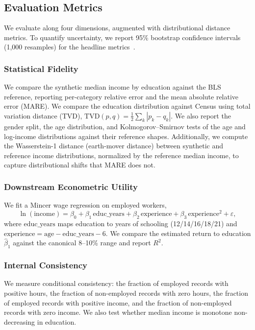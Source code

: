 \documentclass[11pt]{article}
\begin{document}
\subsection{Evaluation Metrics}

We evaluate along four dimensions, augmented with distributional distance metrics.
To quantify uncertainty, we report 95\% bootstrap confidence intervals (1{,}000 resamples) for the headline metrics~\cite{efron1994introduction}.

\subsubsection{Statistical Fidelity}
We compare the synthetic median income by education against the BLS reference, reporting per-category relative error and the mean absolute relative error (MARE).
We compare the education distribution against Census using total variation distance (TVD), $\mathrm{TVD}(p,q)=\frac{1}{2}\sum_k |p_k-q_k|$.
We also report the gender split, the age distribution, and Kolmogorov--Smirnov tests of the age and log-income distributions against their reference shapes.
Additionally, we compute the Wasserstein-1 distance (earth-mover distance) between synthetic and reference income distributions, normalized by the reference median income, to capture distributional shifts that MARE does not.

\subsubsection{Downstream Econometric Utility}
We fit a Mincer wage regression on employed workers,
\begin{equation}
\ln(\text{income}) = \beta_0 + \beta_1\,\text{educ\_years} + \beta_2\,\text{experience} + \beta_3\,\text{experience}^2 + \varepsilon,
\label{eq:mincer}
\end{equation}
where $\text{educ\_years}$ maps education to years of schooling (12/14/16/18/21) and $\text{experience} = \text{age} - \text{educ\_years} - 6$.
We compare the estimated return to education $\hat{\beta}_1$ against the canonical 8--10\% range and report $R^2$.

\subsubsection{Internal Consistency}
We measure conditional consistency: the fraction of employed records with positive hours, the fraction of non-employed records with zero hours, the fraction of employed records with positive income, and the fraction of non-employed records with zero income.
We also test whether median income is monotone non-decreasing in education.
\end{document}
